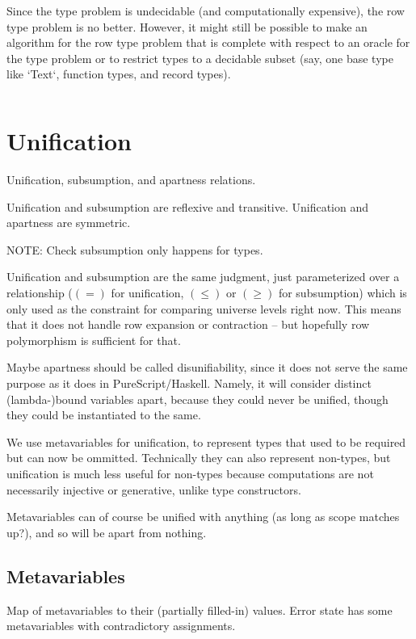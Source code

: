 \documentclass[11pt, twoside, reqno]{book}
\begin{document}
Since the type problem is undecidable (and computationally expensive), the row type problem is no better.
However, it might still be possible to make an algorithm for the row type problem that is complete with respect to an oracle for the type problem or to restrict types to a decidable subset (say, one base type like \inHS`Text`, function types, and record types).

\begin{displaymath}
\end{displaymath}






\chapter{Unification}
Unification, subsumption, and apartness relations.

Unification and subsumption are reflexive and transitive.
Unification and apartness are symmetric.

NOTE: Check subsumption only happens for types.

Unification and subsumption are the same judgment, just parameterized over a relationship ($(=)$ for unification, \((\le)\) or \((\ge)\) for subsumption) which is only used as the constraint for comparing universe levels right now.
This means that it does not handle row expansion or contraction -- but hopefully row polymorphism is sufficient for that.

Maybe apartness should be called disunifiability, since it does not serve the same purpose as it does in PureScript/Haskell.
Namely, it will consider distinct (lambda-)bound variables apart, because they could never be unified, though they could be instantiated to the same.

We use metavariables for unification, to represent types that used to be required but can now be ommitted.
Technically they can also represent non-types, but unification is much less useful for non-types because computations are not necessarily injective or generative, unlike type constructors.

Metavariables can of course be unified with anything (as long as scope matches up?), and so will be apart from nothing.

\section{Metavariables}

Map of metavariables to their (partially filled-in) values.
Error state has some metavariables with contradictory assignments.
\end{document}
